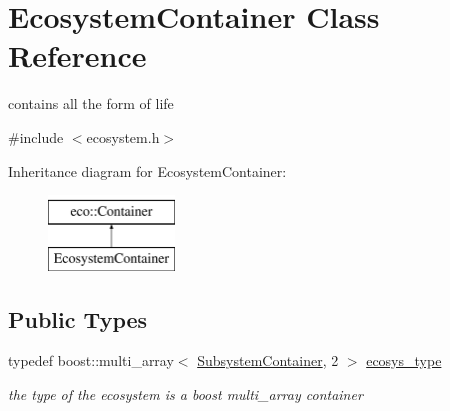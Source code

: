 \hypertarget{classEcosystemContainer}{
\section{EcosystemContainer Class Reference}
\label{classEcosystemContainer}
}


contains all the form of life  




{\ttfamily \#include $<$ecosystem.h$>$}

Inheritance diagram for EcosystemContainer:\begin{figure}[H]
\begin{center}
\leavevmode
\includegraphics[height=2.000000cm]{classEcosystemContainer}
\end{center}
\end{figure}
\subsection*{Public Types}
\begin{DoxyCompactItemize}
\item 
typedef boost::multi\_\-array$<$ \hyperlink{classSubsystemContainer}{SubsystemContainer}, 2 $>$ \hyperlink{classEcosystemContainer_a52c612c138ad2af06dcf353e6c541345}{ecosys\_\-type}
\begin{DoxyCompactList}\small\item\em the type of the ecosystem is a boost multi\_\-array container \end{DoxyCompactList}\end{DoxyCompactItemize}
